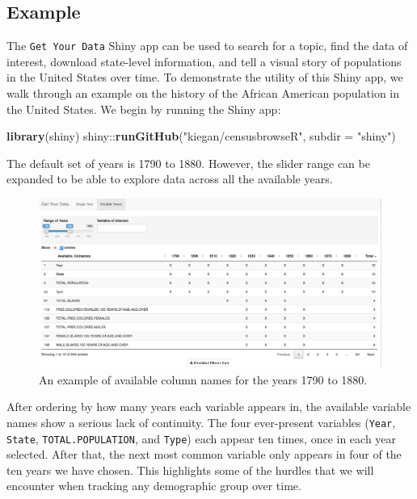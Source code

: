 \documentclass[11pt,]{article}
\newenvironment{Shaded}{\begin{snugshade}}{\end{snugshade}}
\newcommand{\KeywordTok}[1]{\textcolor[rgb]{0.13,0.29,0.53}{\textbf{{#1}}}}
\newcommand{\DataTypeTok}[1]{\textcolor[rgb]{0.13,0.29,0.53}{{#1}}}
\newcommand{\StringTok}[1]{\textcolor[rgb]{0.31,0.60,0.02}{{#1}}}
\newcommand{\NormalTok}[1]{{#1}}
\begin{document}
\subsection{Example}

The \texttt{Get\ Your\ Data} Shiny app can be used to search for a
topic, find the data of interest, download state-level information, and
tell a visual story of populations in the United States over time. To
demonstrate the utility of this Shiny app, we walk through an example on
the history of the African American population in the United States. We
begin by running the Shiny app:

\begin{Shaded}
\begin{Highlighting}[]
\KeywordTok{library}\NormalTok{(shiny)}
\NormalTok{shiny::}\KeywordTok{runGitHub}\NormalTok{(}\StringTok{"kiegan/censusbrowseR"}\NormalTok{, }\DataTypeTok{subdir =} \StringTok{"shiny"}\NormalTok{)}
\end{Highlighting}
\end{Shaded}

The default set of years is 1790 to 1880. However, the slider range can
be expanded to be able to explore data across all the available years.

\begin{figure}[htbp]
\centering
\includegraphics{./figures/app-sshot-multiple-years.png}
\caption{An example of available column names for the years 1790 to
1880.}
\end{figure}

After ordering by how many years each variable appears in, the available
variable names show a serious lack of continuity. The four ever-present
variables (\texttt{Year}, \texttt{State}, \texttt{TOTAL.POPULATION}, and
\texttt{Type}) each appear ten times, once in each year selected. After
that, the next most common variable only appears in four of the ten
years we have chosen. This highlights some of the hurdles that we will
encounter when tracking any demographic group over time.
\end{document}
